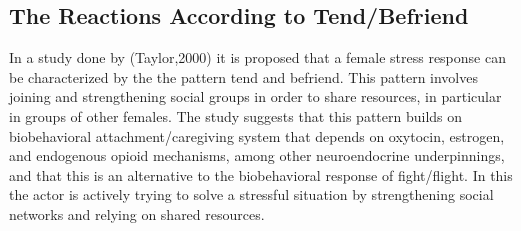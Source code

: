 \subsection{The Reactions According to Tend/Befriend}
In a study done by \cite{tendbefriend}(Taylor,2000) it is proposed that a female stress response can be characterized by the the pattern tend and befriend. This pattern involves joining and strengthening social groups in order to share resources, in particular in groups of other females. The study suggests that this pattern builds on biobehavioral attachment/caregiving system that depends on oxytocin, estrogen, and endogenous opioid mechanisms, among other neuroendocrine underpinnings, and that this is an alternative to the biobehavioral response of fight/flight. In this the actor is actively trying to solve a stressful situation by strengthening social networks and relying on shared resources. \cite{tendbefriend}
